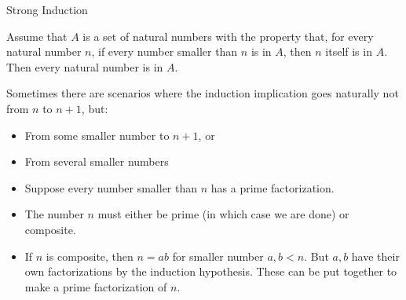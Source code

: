 \documentclass[10pt]{beamer}
\begin{document}
\begin{frame}{Strong Induction}
\footnotesize
 \begin{mygreenbox}[title=Strong Induction]
Assume that $A$ is a set of natural numbers with the property that, for every natural number $n$, if every number smaller than $n$ is in $A$, then $n$ itself is in $A$. Then every natural number is in $A$.
\end{mygreenbox}

\vfill 

 \begin{myredbox}[title=When to Use Strong Induction]
 Sometimes there are scenarios where the induction implication goes naturally not from $n$ to $n+1$, but:
 \begin{itemize}
 \item From some smaller number to $n+1$, or
 \item From several smaller numbers	
 \end{itemize}
 \end{myredbox}

\vfill 
 \begin{myyellowbox}[title=Example: Every positive integer has a prime factorization]
 \begin{itemize}
 \item Suppose every number smaller than $n$ has a prime factorization.
 \item The number $n$ must either be prime (in which case we are done) or composite.
 \item If $n$ is composite, then $n=ab$ for smaller number $a,b<n$.  But $a,b$ have their own  factorizations by the induction hypothesis.  These can be put together to make a prime factorization of $n$.
 \end{itemize}

 \end{myyellowbox}
\end{frame}
\end{document}
